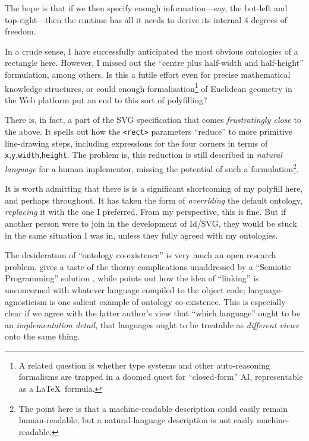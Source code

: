 The hope is that if we then specify enough information---say, the
bot-left and top-right---then the runtime has all it needs to derive its
internal 4 degrees of freedom.

In a crude sense, I have successfully anticipated the most obvious
ontologies of a rectangle here. However, I missed out the ``centre plus
half-width and half-height'' formulation, among others. Is this a futile
effort even for precise mathematical knowledge structures, or could
enough formalisation\footnote{A related question is whether type systems
  and other auto-reasoning formalisms are trapped in a doomed quest for
  ``closed-form'' AI, representable as a \LaTeX~formula.} of Euclidean
geometry in the Web platform put an end to this sort of polyfilling?

There is, in fact, a part of the SVG specification \cite{svg-rect} that
comes \emph{frustratingly close} to the above. It spells out how the
\texttt{\textless{}rect\textgreater{}} parameters ``reduce'' to more
primitive line-drawing steps, including expressions for the four corners
in terms of \texttt{x},\texttt{y},\texttt{width},\texttt{height}{}. The
problem is, this reduction is still described in \emph{natural language}
for a human implementor, missing the potential of such a
formulation\footnote{The point here is that a machine-readable
  description could easily remain human-readable, but a natural-language
  description is not easily machine-readable.}.

It is worth admitting that there is is a significant shortcoming of my
polyfill here, and perhaps throughout. It has taken the form of
\emph{overriding} the default ontology, \emph{replacing} it with the one
I preferred. From my perspective, this is fine. But if another person
were to join in the development of Id{}/SVG, they would be stuck in the
same situation I was in, unless they fully agreed with my ontologies.

The desideratum of ``ontology co-existence'' is very much an open
research problem. \cite{crit-semprola} gives a taste of the thorny
complications unaddressed by a ``Semiotic Programming'' solution
\cite{semprola}, while \cite{kell-c} points out how the idea of
``linking'' is unconcerned with whatever language compiled to the object
code; language-agnosticism is one salient example of ontology
co-existence. This is especially clear if we agree with the latter
author's view that ``which language'' ought to be an
\emph{implementation detail}, that languages ought to be treatable as
\emph{different views} onto the same thing.

